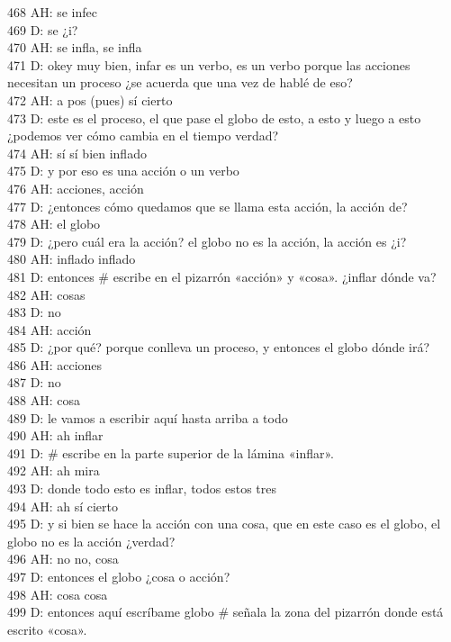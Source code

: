 468 AH: se infec\\
469 D: se ¿i?\\
470 AH: se infla, se infla\\
471 D: okey muy bien, infar es un verbo, es un verbo porque las acciones necesitan un proceso ¿se acuerda que una vez de hablé de eso?\\
472 AH: a pos (pues) sí cierto\\
473 D: este es el proceso, el que pase el globo de esto, a esto y luego a esto ¿podemos ver cómo cambia en el tiempo verdad?\\
474 AH: sí sí bien inflado\\
475 D: y por eso es una acción o un verbo\\
476 AH: acciones, acción\\
477 D: ¿entonces cómo quedamos que se llama esta acción, la acción de?\\
478 AH: el globo\\
479 D: ¿pero cuál era la acción? el globo no es la acción, la acción es ¿i?\\
480 AH: inflado inflado\\
481 D: entonces \# escribe en el pizarrón «acción» y «cosa». ¿inflar dónde va?\\
482 AH: cosas\\
483 D: no\\
484 AH: acción\\
485 D: ¿por qué? porque conlleva un proceso, y entonces el globo dónde irá?\\
486 AH: acciones\\
487 D: no\\
488 AH: cosa\\
489 D: le vamos a escribir aquí hasta arriba a todo\\
490 AH: ah inflar\\
491 D: \# escribe en la parte superior de la lámina «inflar».\\
492 AH: ah mira\\
493 D: donde todo esto es inflar, todos estos tres\\
494 AH: ah sí cierto\\
495 D: y si bien se hace la acción con una cosa, que en este caso es el globo, el globo no es la acción ¿verdad?\\
496 AH: no no, cosa\\
497 D: entonces el globo ¿cosa o acción?\\
498 AH: cosa cosa\\
499 D: entonces aquí escríbame globo \# señala la zona del pizarrón donde está escrito «cosa».\\
